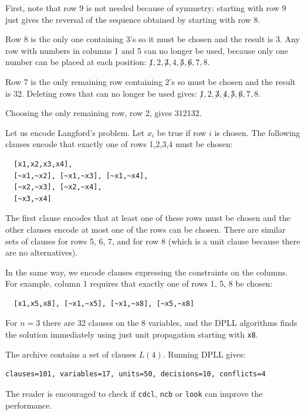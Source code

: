 \documentclass[11pt]{report}
\begin{document}
First, note that row 9 is not needed because of symmetry: starting with row 9 just gives the reversal of the  sequence obtained by starting with row 8.

Row 8 is the only one containing $3$'s so it must be chosen and the result is 3\textvisiblespace \textvisiblespace {}\textvisiblespace. Any row with numbers in columns 1 and 5 can no longer be used, because only one number can be placed at each position: $\not 1,2,\not 3,4,\not 5, \not 6, 7, 8$.

Row 7 is the only remaining row containing $2$'s so must be chosen and the result is 32. Deleting rows that can no longer be used gives: $\not 1,2,\not 3,\not 4,\not 5, \not 6, 7, 8$.

Choosing the only remaining row, row 2, gives 3{}1{}2{}1{}3{}2.

Let us encode Langford's problem. Let $x_i$ be true if row $i$ is chosen. The following clauses encode that exactly one of rows 1,2,3,4 must be chosen:
\begin{verbatim}
  [x1,x2,x3,x4],
  [~x1,~x2], [~x1,~x3], [~x1,~x4],
  [~x2,~x3], [~x2,~x4],
  [~x3,~x4]
\end{verbatim}
The first clause encodes that at least one of these rows must be chosen and the other clauses encode at most one of the rows can be chosen. There are similar sets of clauses for rows 5, 6, 7, and for row 8 (which is a unit clause because there are no alternatives).

In the same way, we encode clauses expressing the constraints on the columns. For example, column 1 requires that exactly one of rows 1, 5, 8 be chosen:
\begin{verbatim}
  [x1,x5,x8], [~x1,~x5], [~x1,~x8], [~x5,~x8]
\end{verbatim}

For $n=3$ there are 32 clauses on the 8 variables, and the DPLL algorithms finds the solution immediately using just unit propagation starting with \texttt{x8}.

The archive contains a set of clauses $L(4)$. Running DPLL gives:
\begin{verbatim}
clauses=101, variables=17, units=50, decisions=10, conflicts=4
\end{verbatim}
The reader is encouraged to check if \texttt{cdcl}, \texttt{ncb} or \texttt{look} can improve the performance.

\newpage

\end{document}
